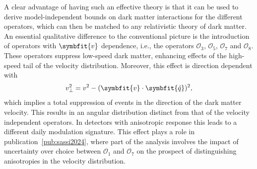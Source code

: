 \documentclass[b5paper, 10pt, twoside]{book}
\renewcommand{\vec}[1]{\symbfit{#1}}
\newcommand{\unitv}[1]{\symbfit{\hat{#1}}}
\begin{document}
A clear advantage of having such an effective theory is that it can be used to derive model-independent bounds on dark matter interactions for the different operators, which can then be matched to any relativistic theory of dark matter. An essential qualitative difference to the conventional picture is the introduction of operators with $\vec{v}$ dependence, i.e., the operators $\mathcal{O}_3$, $\mathcal{O}_5$, $\mathcal{O}_7$ and $\mathcal{O}_8$. These operators suppress low-speed dark matter, enhancing effects of the high-speed tail of the velocity distribution. Moreover, this effect is direction dependent with
\begin{equation}
    v_\perp^2=v^2-(\vec{v}\cdot\unitv{q})^2,
\end{equation}
which implies a total suppression of events in the direction of the dark matter velocity. This results in an angular distribution distinct from that of the velocity independent operators. In detectors with anisotropic response this leads to a different daily modulation signature. This effect plays a role in publication~\ref{pub:sassi2024}, where part of the analysis involves the impact of uncertainty over choice between $\mathcal{O}_1$ and $\mathcal{O}_7$ on the prospect of distinguishing anisotropies in the velocity distribution.
\end{document}
